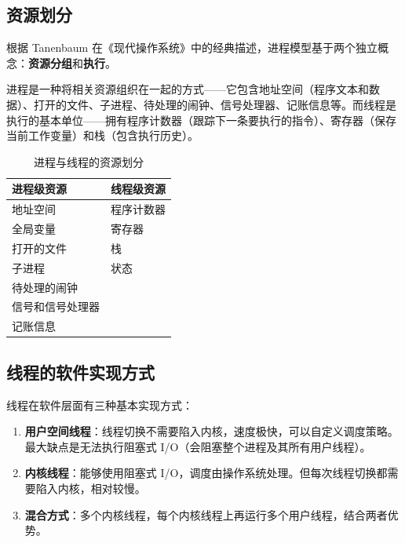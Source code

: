 \subsection{资源划分}

根据 Tanenbaum 在《现代操作系统》中的经典描述，进程模型基于两个独立概念：\textbf{资源分组}和\textbf{执行}。

进程是一种将相关资源组织在一起的方式——它包含地址空间（程序文本和数据）、打开的文件、子进程、待处理的闹钟、信号处理器、记账信息等。而线程是执行的基本单位——拥有程序计数器（跟踪下一条要执行的指令）、寄存器（保存当前工作变量）和栈（包含执行历史）。

\begin{table}[H]
\centering
\caption{进程与线程的资源划分}
\begin{tabular}{ll}
\toprule
\textbf{进程级资源} & \textbf{线程级资源} \\
\midrule
地址空间         & 程序计数器 \\
全局变量         & 寄存器 \\
打开的文件       & 栈 \\
子进程           & 状态 \\
待处理的闹钟     & \\
信号和信号处理器 & \\
记账信息         & \\
\bottomrule
\end{tabular}
\end{table}

\subsection{线程的软件实现方式}

线程在软件层面有三种基本实现方式：

\begin{enumerate}[leftmargin=1.5em]
    \item \textbf{用户空间线程}：线程切换不需要陷入内核，速度极快，可以自定义调度策略。最大缺点是无法执行阻塞式 I/O（会阻塞整个进程及其所有用户线程）。
    \item \textbf{内核线程}：能够使用阻塞式 I/O，调度由操作系统处理。但每次线程切换都需要陷入内核，相对较慢。
    \item \textbf{混合方式}：多个内核线程，每个内核线程上再运行多个用户线程，结合两者优势。
\end{enumerate}


